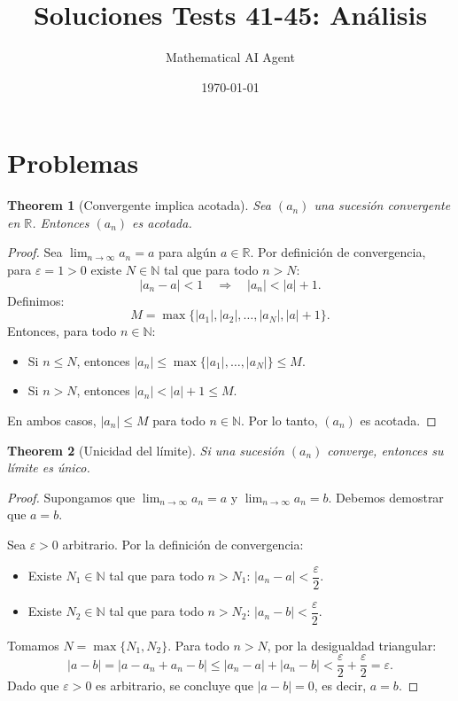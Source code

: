 \documentclass[11pt,a4paper]{article}
\title{Soluciones Tests 41-45: Análisis}
\author{Mathematical AI Agent}
\date{\today}
\theoremstyle{plain}
\newtheorem{theorem}{Theorem}[section]
\theoremstyle{definition}
\begin{document}
\maketitle
\section{Problemas}


\begin{theorem}[Convergente implica acotada]
Sea $(a_n)$ una sucesión convergente en $\mathbb{R}$. Entonces $(a_n)$ es acotada.
\end{theorem}

\begin{proof}
Sea $\lim_{n\to\infty} a_n = a$ para algún $a \in \mathbb{R}$. Por definición de convergencia, para $\varepsilon = 1 > 0$ existe $N \in \mathbb{N}$ tal que para todo $n > N$:
\[
|a_n - a| < 1 \quad \Longrightarrow \quad |a_n| < |a| + 1.
\]
Definimos:
\[
M = \max\{|a_1|, |a_2|, \ldots, |a_N|, |a| + 1\}.
\]
Entonces, para todo $n \in \mathbb{N}$:
\begin{itemize}
    \item Si $n \leq N$, entonces $|a_n| \leq \max\{|a_1|, \ldots, |a_N|\} \leq M$.
    \item Si $n > N$, entonces $|a_n| < |a| + 1 \leq M$.
\end{itemize}
En ambos casos, $|a_n| \leq M$ para todo $n \in \mathbb{N}$. Por lo tanto, $(a_n)$ es acotada.
\end{proof}


\begin{theorem}[Unicidad del límite]
Si una sucesión $(a_n)$ converge, entonces su límite es único.
\end{theorem}

\begin{proof}
Supongamos que $\lim_{n\to\infty} a_n = a$ y $\lim_{n\to\infty} a_n = b$. Debemos demostrar que $a = b$.

Sea $\varepsilon > 0$ arbitrario. Por la definición de convergencia:
\begin{itemize}
    \item Existe $N_1 \in \mathbb{N}$ tal que para todo $n > N_1$: $|a_n - a| < \dfrac{\varepsilon}{2}$.
    \item Existe $N_2 \in \mathbb{N}$ tal que para todo $n > N_2$: $|a_n - b| < \dfrac{\varepsilon}{2}$.
\end{itemize}
Tomamos $N = \max\{N_1, N_2\}$. Para todo $n > N$, por la desigualdad triangular:
\[
|a - b| = |a - a_n + a_n - b| \leq |a_n - a| + |a_n - b| < \frac{\varepsilon}{2} + \frac{\varepsilon}{2} = \varepsilon.
\]
Dado que $\varepsilon > 0$ es arbitrario, se concluye que $|a - b| = 0$, es decir, $a = b$.
\end{proof}
\end{document}
